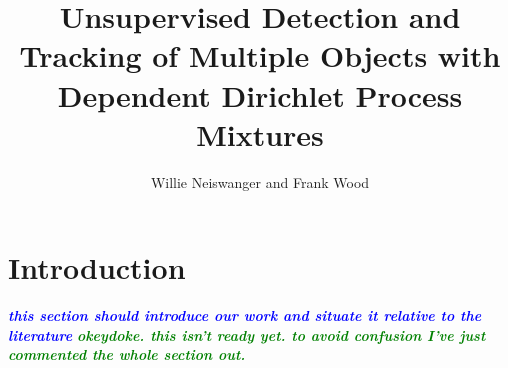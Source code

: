 \documentclass{article}
\newcommand{\frank}[1]{\textcolor{red}{\textsf{\emph{\textbf{\textcolor{blue}{#1}}}}}}
\newcommand{\willie}[1]{\textcolor{green}{\textsf{\emph{\textbf{\textcolor{green}{#1}}}}}}
\begin{document}
\title{Unsupervised Detection and Tracking of Multiple Objects with Dependent Dirichlet Process Mixtures}
\author{Willie Neiswanger and Frank Wood}
\maketitle
\mbox{}




\section{Introduction}

\frank{this section should introduce our work and situate it relative to the literature}
\willie{okeydoke. this isn't ready yet. to avoid confusion I've just commented the whole section out.}




\end{document}
